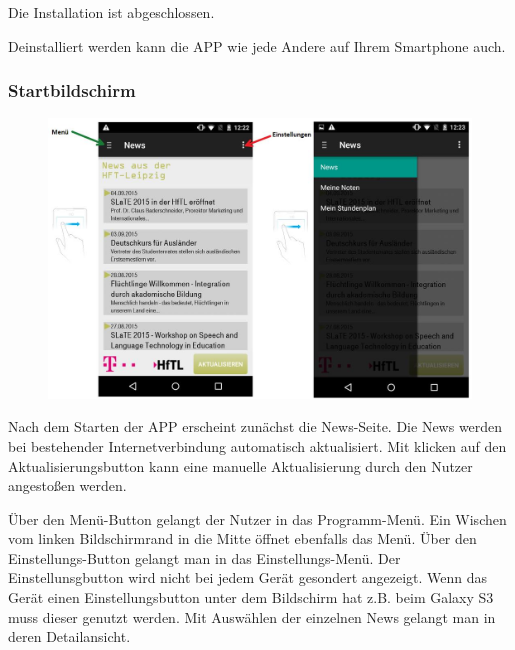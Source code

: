 Die Installation ist abgeschlossen.

Deinstalliert werden kann die APP wie jede Andere auf Ihrem Smartphone auch.

\newpage

\subsubsection{Startbildschirm}


\begin{figure}[h]
	\centering
	\includegraphics[scale=0.5]{03_Bedienungsanleitung/img/start2.jpg}
	\label{img:grafik-dummy}
\end{figure}


Nach dem Starten der APP erscheint zunächst die News-Seite. Die News werden bei bestehender Internetverbindung automatisch aktualisiert. Mit klicken auf den Aktualisierungsbutton kann eine manuelle Aktualisierung durch den Nutzer angestoßen werden.

Über den Menü-Button gelangt der Nutzer in das Programm-Menü. Ein Wischen vom linken Bildschirmrand in die Mitte öffnet ebenfalls das Menü. Über den Einstellungs-Button gelangt man in das Einstellungs-Menü. Der Einstellunsgbutton wird nicht bei jedem Gerät gesondert angezeigt. Wenn das Gerät einen Einstellungsbutton unter dem Bildschirm hat z.B. beim Galaxy S3 muss dieser genutzt werden.
Mit Auswählen der einzelnen News gelangt man in deren Detailansicht.


